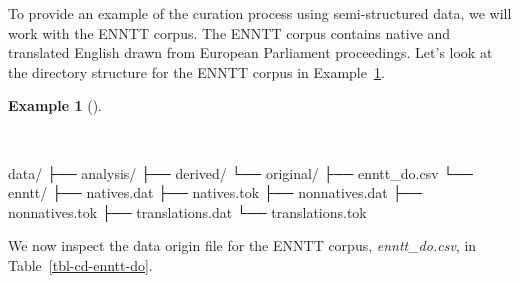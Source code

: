 \documentclass[
  letterpaper,
  DIV=11,
  numbers=noendperiod]{scrreprt}
\newenvironment{Shaded}{\begin{snugshade}}{\end{snugshade}}
\newcommand{\ExtensionTok}[1]{\textcolor[rgb]{0.00,0.00,0.00}{#1}}
\newcommand{\NormalTok}[1]{\textcolor[rgb]{0.00,0.00,0.00}{#1}}
\theoremstyle{definition}
\newtheorem{example}{Example}[chapter]
\theoremstyle{remark}
\begin{document}
To provide an example of the curation process using semi-structured
data, we will work with the ENNTT corpus. The ENNTT corpus contains
native and translated English drawn from European Parliament
proceedings. Let's look at the directory structure for the ENNTT corpus
in Example~\ref{exm-cd-enntt-structure}.

\begin{example}[]\protect\hypertarget{exm-cd-enntt-structure}{}\label{exm-cd-enntt-structure}

~

\begin{Shaded}
\begin{Highlighting}[]
\ExtensionTok{data/}
\ExtensionTok{├──}\NormalTok{ analysis/}
\ExtensionTok{├──}\NormalTok{ derived/}
\ExtensionTok{└──}\NormalTok{ original/}
    \ExtensionTok{├──}\NormalTok{ enntt\_do.csv}
    \ExtensionTok{└──}\NormalTok{ enntt/}
        \ExtensionTok{├──}\NormalTok{ natives.dat}
        \ExtensionTok{├──}\NormalTok{ natives.tok}
        \ExtensionTok{├──}\NormalTok{ nonnatives.dat}
        \ExtensionTok{├──}\NormalTok{ nonnatives.tok}
        \ExtensionTok{├──}\NormalTok{ translations.dat}
        \ExtensionTok{└──}\NormalTok{ translations.tok}
\end{Highlighting}
\end{Shaded}

\end{example}

We now inspect the data origin file for the ENNTT corpus,
\emph{enntt\_do.csv}, in Table~\ref{tbl-cd-enntt-do}.
\end{document}
